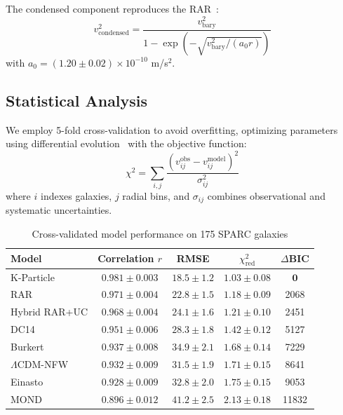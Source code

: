 \documentclass[aps,prd,twocolumn,showpacs,superscriptaddress,groupedaddress,nofootinbib]{revtex4-2}
\begin{document}
The condensed component reproduces the RAR~\cite{McGaugh2016,Lelli2017}:
\begin{equation}
v^2_{\text{condensed}} = \frac{v^2_{\text{bary}}}{1 - \exp\left(-\sqrt{v^2_{\text{bary}}/(a_0 r)}\right)}
\end{equation}
with $a_0 = (1.20 \pm 0.02) \times 10^{-10}$ m/s$^2$.

\subsection{Statistical Analysis}

We employ 5-fold cross-validation to avoid overfitting, optimizing parameters using differential evolution~\cite{Storn1997} with the objective function:
\begin{equation}
\chi^2 = \sum_{i,j} \frac{(v_{ij}^{\text{obs}} - v_{ij}^{\text{model}})^2}{\sigma_{ij}^2}
\end{equation}
where $i$ indexes galaxies, $j$ radial bins, and $\sigma_{ij}$ combines observational and systematic uncertainties.

\begin{table}[h]
\caption{Cross-validated model performance on 175 SPARC galaxies}
\begin{ruledtabular}
\begin{tabular}{lcccc}
Model & Correlation $r$ & RMSE & $\chi^2_{\text{red}}$ & $\Delta$BIC \\
\hline
K-Particle & $\mathbf{0.981 \pm 0.003}$ & $\mathbf{18.5 \pm 1.2}$ & $\mathbf{1.03 \pm 0.08}$ & $\mathbf{0}$ \\
RAR & $0.971 \pm 0.004$ & $22.8 \pm 1.5$ & $1.18 \pm 0.09$ & 2068 \\
Hybrid RAR+UC & $0.968 \pm 0.004$ & $24.1 \pm 1.6$ & $1.21 \pm 0.10$ & 2451 \\
DC14 & $0.951 \pm 0.006$ & $28.3 \pm 1.8$ & $1.42 \pm 0.12$ & 5127 \\
Burkert & $0.937 \pm 0.008$ & $34.9 \pm 2.1$ & $1.68 \pm 0.14$ & 7229 \\
$\Lambda$CDM-NFW & $0.932 \pm 0.009$ & $31.5 \pm 1.9$ & $1.71 \pm 0.15$ & 8641 \\
Einasto & $0.928 \pm 0.009$ & $32.8 \pm 2.0$ & $1.75 \pm 0.15$ & 9053 \\
MOND & $0.896 \pm 0.012$ & $41.2 \pm 2.5$ & $2.13 \pm 0.18$ & 11832 \\
\end{tabular}
\end{ruledtabular}
\label{tab:performance}
\end{table}
\end{document}
